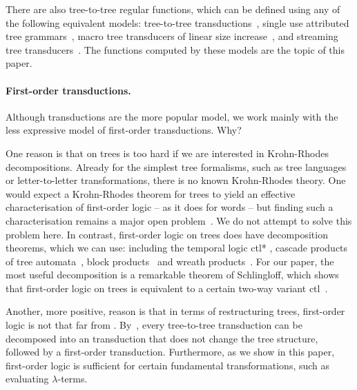 There are also tree-to-tree regular functions, which can be defined using any of the following equivalent models: \mso tree-to-tree transductions~\cite[Section 3]{bloem_comparison_2000}, single use attributed tree grammars~\cite{bloem_comparison_2000}, macro tree transducers of linear size increase~\cite[Theorem 7.1]{engelfriet_macro_2003}, and streaming tree transducers~\cite[Theorem 4.6]{alur2017streaming}. The  functions computed by these models are the topic of this paper. 

\paragraph*{First-order transductions. } Although \mso transductions are the more popular model, we work mainly with the less expressive model of first-order transductions. Why?

One reason is that \mso on trees is too hard if we are interested in Krohn-Rhodes decompositions.  Already for the simplest tree formalisms, such as tree languages or letter-to-letter transformations, there is no known  Krohn-Rhodes theory. One would expect a Krohn-Rhodes theorem  for trees to yield an effective characterisation of first-order logic -- as it does for words -- but finding such a characterisation remains a major open problem~\cite[Section 3]{bojanczyk2015automata}. We do not attempt to solve this problem here. In contrast, first-order logic on trees does have decomposition theorems, which we can use: including the temporal logic {\sc ctl*} \cite[Main Theorem]{haferthomas}, cascade products of tree automata~\cite[Theorem 2.5.7]{bojanczykDecidablePropertiesTree2004}, block products~\cite[Corollary 3.11]{esik2010algebraic} and wreath products~\cite[Theorem 3.1]{bojanczykWreathProductsForest2012}. For our paper, the most useful decomposition is a remarkable theorem of Schlingloff, which shows that first-order logic on trees is equivalent to a certain two-way variant  {\sc ctl}~\cite[Theorem 4.5]{schlingloff1992expressive}.

Another, more positive, reason is that in terms of restructuring trees, first-order logic is not that far from \mso.  By~\cite[Corollary 1]{colcombetCombinatorialTheoremTrees2007},  every \mso tree-to-tree transduction can be decomposed into an \mso transduction that does not change the tree structure, followed by a first-order transduction. Furthermore, as we show in this paper, first-order logic is sufficient for certain fundamental transformations, such as evaluating $\lambda$-terms. 


